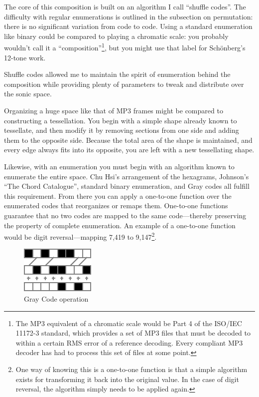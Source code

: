 \documentclass{thesis}
\begin{document}
The core of this composition is built on an algorithm I call ``shuffle codes''. The difficulty with regular enumerations is outlined in the subsection on permutation: there is no significant variation from code to code. Using a standard enumeration like binary could be compared to playing a chromatic scale: you probably wouldn't call it a ``composition''\footnote{The MP3 equivalent of a chromatic scale would be Part 4 of the ISO/IEC 11172-3 standard, which provides a set of MP3 files that must be decoded to within a certain RMS error of a reference decoding. Every compliant MP3 decoder has had to process this set of files at some point.}, but you might use that label for Sch\"onberg's 12-tone work.

Shuffle codes allowed me to maintain the spirit of enumeration behind the composition while providing plenty of parameters to tweak and distribute over the sonic space.

Organizing a huge space like that of MP3 frames might be compared to constructing a tessellation. You begin with a simple shape already known to tessellate, and then modify it by removing sections from one side and adding them to the opposite side. Because the total area of the shape is maintained, and every edge always fits into its opposite, you are left with a new tessellating shape.

Likewise, with an enumeration you must begin with an algorithm known to enumerate the entire space. Chu Hsi's arrangement of the hexagrams, Johnson's ``The Chord Catalogue'', standard binary enumeration, and Gray codes all fulfill this requirement. From there you can apply a one-to-one function over the enumerated codes that reorganizes or remaps them. One-to-one functions guarantee that no two codes are mapped to the same code---thereby preserving the property of complete enumeration. An example of a one-to-one function would be digit reversal---mapping 7,419 to 9,147\footnote{One way of knowing this is a one-to-one function is that a simple algorithm exists for transforming it back into the original value. In the case of digit reversal, the algorithm simply needs to be applied again.}.

\begin{figure}
	\begin{center}
		\includegraphics[scale=1.5]{graphics/gray-operation.pdf}
		\caption{Gray Code operation}
		\label{gray-operation}
	\end{center}
\end{figure}
\end{document}
